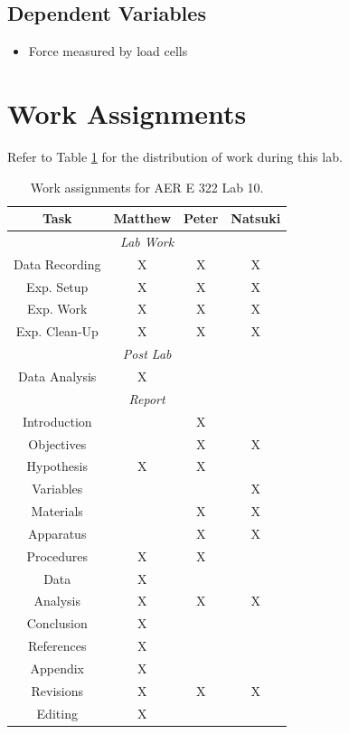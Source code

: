 \documentclass[12 pt]{report}
\begin{document}
\subsection{Dependent Variables} \label{variables-dependent_variables}
\begin{itemize}
	\item Force measured by load cells
\end{itemize}

\section{Work Assignments} \label{work_assignments}
Refer to Table \ref{table:work_assignments} for the distribution of work during this lab.

\begin{table}[!htbp]
\caption{Work assignments for AER E 322 Lab 10.}
\begin{center}
	\begin{tabular}{|c|c|c|c|}
		\hline
		\multicolumn{1}{|c|}{\textbf{Task}}&\textbf{Matthew}&\textbf{Peter}&\textbf{Natsuki}\\
		\hline
		\multicolumn{4}{|c|}{\textit{Lab Work}}\\
		\hline
		Data Recording&X&X&X\\
		\hline
		Exp. Setup&X&X&X\\
		\hline
		Exp. Work&X&X&X\\
		\hline
		Exp. Clean-Up&X&X&X\\
		\hline
		\multicolumn{4}{|c|}{\textit{Post Lab}}\\
		\hline
		Data Analysis&X&&\\
		\hline
		\multicolumn{4}{|c|}{\textit{Report}}\\
		\hline
		Introduction&&X&\\
		\hline
		Objectives&&X&X\\
		\hline
		Hypothesis&X&X&\\
		\hline
		Variables&&&X\\
		\hline
		Materials&&X&X\\
		\hline
		Apparatus&&X&X\\
		\hline
		Procedures&X&X&\\
		\hline
		Data&X&&\\
		\hline
		Analysis&X&X&X\\
		\hline
		Conclusion&X&&\\
		\hline
		References&X&&\\
		\hline
		Appendix&X&&\\
		\hline
		Revisions&X&X&X\\
		\hline
		Editing&X&&\\
		\hline
	\end{tabular}
\end{center}
\label{table:work_assignments}
\end{table}
\end{document}
